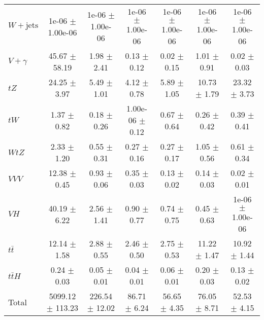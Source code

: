 \begin{tabular}{|l|S|S|S|S|S|S|}
  $W+\text{jets}$   & 1e-06 $\pm$ 1.00e-06 & 1e-06 $\pm$ 1.00e-06 & 1e-06 $\pm$ 1.00e-06 & 1e-06 $\pm$ 1.00e-06 & 1e-06 $\pm$ 1.00e-06 & 1e-06 $\pm$ 1.00e-06 \\ 
  $V+\gamma$   & 45.67 $\pm$ 58.19 & 1.98 $\pm$ 2.41 & 0.13 $\pm$ 0.12 & 0.02 $\pm$ 0.15 & 1.01 $\pm$ 0.91 & 0.02 $\pm$ 0.03 \\ 
  $tZ$   & 24.25 $\pm$ 3.97 & 5.49 $\pm$ 1.01 & 4.12 $\pm$ 0.78 & 5.89 $\pm$ 1.05 & 10.73 $\pm$ 1.79 & 23.32 $\pm$ 3.73 \\ 
  $tW$   & 1.37 $\pm$ 0.82 & 0.18 $\pm$ 0.26 & 1.00e-06 $\pm$ 0.12 & 0.67 $\pm$ 0.64 & 0.26 $\pm$ 0.42 & 0.39 $\pm$ 0.41 \\ 
  $WtZ$   & 2.33 $\pm$ 1.20 & 0.55 $\pm$ 0.31 & 0.27 $\pm$ 0.16 & 0.27 $\pm$ 0.17 & 1.05 $\pm$ 0.56 & 0.61 $\pm$ 0.34 \\ 
  $VVV$   & 12.38 $\pm$ 0.45 & 0.93 $\pm$ 0.06 & 0.35 $\pm$ 0.03 & 0.13 $\pm$ 0.02 & 0.14 $\pm$ 0.03 & 0.02 $\pm$ 0.01 \\ 
  $VH$   & 40.19 $\pm$ 6.22 & 2.56 $\pm$ 1.41 & 0.90 $\pm$ 0.77 & 0.74 $\pm$ 0.75 & 0.45 $\pm$ 0.63 & 1e-06 $\pm$ 1.00e-06 \\ 
  $t\bar{t}$   & 12.14 $\pm$ 1.58 & 2.88 $\pm$ 0.55 & 2.46 $\pm$ 0.50 & 2.75 $\pm$ 0.53 & 11.22 $\pm$ 1.47 & 10.92 $\pm$ 1.44 \\ 
  $t\bar{t}H$   & 0.24 $\pm$ 0.03 & 0.05 $\pm$ 0.01 & 0.04 $\pm$ 0.01 & 0.06 $\pm$ 0.01 & 0.20 $\pm$ 0.03 & 0.13 $\pm$ 0.02 \\ 
\hline 
  Total  & 5099.12 $\pm$ 113.23 & 226.54 $\pm$ 12.02 & 86.71 $\pm$ 6.24 & 56.65 $\pm$ 4.35 & 76.05 $\pm$ 8.71 & 52.53 $\pm$ 4.15 \\ 
\hline 
\end{tabular} 

